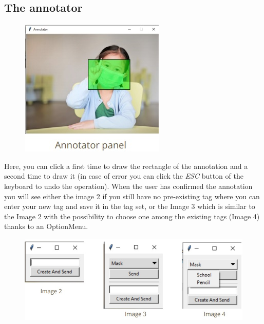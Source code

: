 \documentclass[a4paper, 11pt]{article}
\begin{document}
\subsection{The annotator}
\begin{figure}
  \includegraphics{images_latex/annotator.jpg}
\end{figure}
Here, you can click a first time to draw the rectangle of the annotation and a second time to draw it (in case of error you can click the \textit{ESC} button of the keyboard to undo the operation).
When the user has confirmed the annotation you will see either the image 2 if you still have no pre-existing tag where you can enter your new tag and save it in the tag set, or the Image 3 which is similar to the Image 2 with the possibility to choose one among the existing tags (Image 4) thanks to an OptionMenu.
\begin{figure}[htb]
  \includegraphics[scale=0.9]{images_latex/images.jpg}
\end{figure}
\end{document}
